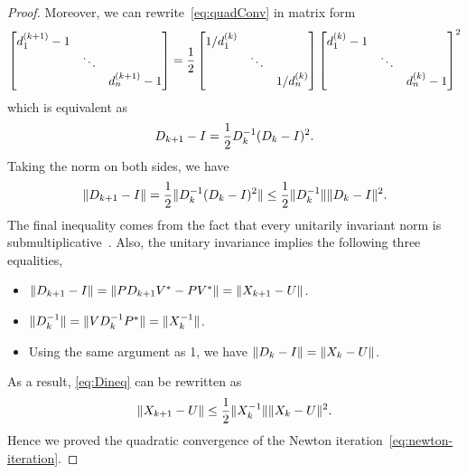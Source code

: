 \documentclass[12pt]{article}
\begin{document}
\begin{proof}
    Moreover, we can rewrite~\eqref{eq:quadConv} in matrix form
    \begin{equation}
        \notag
        \begin{bmatrix}
            d_1^{(k+1)}-1 & & \\
            & \ddots & \\
            & & d_n^{(k+1)}-1
        \end{bmatrix} = 
        \frac{1}{2}
        \begin{bmatrix}
            1/d_1^{(k)} & & \\
            & \ddots & \\
            & & 1/d_n^{(k)}
        \end{bmatrix}
        \begin{bmatrix}
            d_1^{(k)}-1 & & \\
            & \ddots & \\
            & & d_n^{(k)}-1
        \end{bmatrix}^2
    \end{equation}
    which is equivalent as 
    \begin{equation}
        \notag 
        D_{k+1} - I = \frac{1}{2} D_k^{-1} (D_k - I)^2.
    \end{equation}
    Taking the norm on both sides, we have 
    \begin{equation}
        \label{eq:Dineq} 
        \|{D_{k+1} - I}\| = \frac{1}{2} \|{D_k^{-1} (D_k - I)^2}\|\leq \frac{1}{2} \|{D_k^{-1}}\|\|{D_k - I}\|^2.
    \end{equation}
    The final inequality comes from the fact that every unitarily invariant norm is submultiplicative~. Also, the unitary invariance implies the following three equalities,
    \begin{itemize}
        \item $\|{D_{k+1}- I}\| = \|{PD_{k+1} V^* - PV^*}\| = \|{X_{k+1} - U}\|$. 
        \item $\|{D_k^{-1}}\| = \|{VD_k^{-1} P^*}\| =\|{X_k^{-1}}\|$.
        \item Using the same argument as 1, we have $\|{D_k - I}\| = \|{X_k - U}\|$.
    \end{itemize}
    As a result, \eqref{eq:Dineq} can be rewritten as 
    \begin{equation}\notag
        \|{X_{k+1} - U}\| \leq \frac 12 \|{X_k^{-1}}\|\|{X_k - U}\|^2.
    \end{equation}
    Hence we proved the quadratic convergence of the Newton iteration~\eqref{eq:newton-iteration}.
\end{proof}
\end{document}
